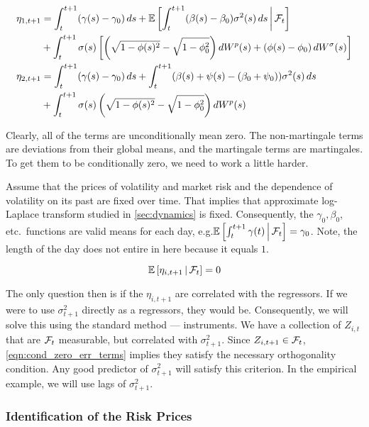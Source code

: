 \documentclass[11pt, letterpaper, twoside, final]{article}
\begin{document}
\begin{alignat}{1}
    \eta_{1,t+1} 
    &= \int_t^{t+1}(\gamma(s) - \gamma_0) \dif s + \E\left[\int_t^{t+1} (\beta(s) - \beta_0) \sigma^2(s) \dif s
        \mvert \F_t\right] \\
    &+ \int_t^{t+1} \sigma(s) \left[\left(\sqrt{1 - \phi(s)^2} - \sqrt{1 - \phi_0^2}\right) \dif W^{p}(s) +
        \left(\phi(s) - \phi_0\right) \dif W^{\sigma}(s)\right] \nonumber \\
%
    \eta_{2,t+1} 
    &= \int_t^{t+1}(\gamma(s) - \gamma_0) \dif s + \int_t^{t+1} (\beta(s) + \psi(s) - (\beta_0 + \psi_0))
       \sigma^2(s) \dif s \\
    &+ \int_t^{t+1} \sigma(s) \left(\sqrt{1 - \phi(s)^2} - \sqrt{1 - \phi_0^2}\right) \dif W^{p}(s) \nonumber 
\end{alignat}

Clearly, all of the terms are  unconditionally mean zero. 
The non-martingale terms are deviations from their global means, and the martingale terms are martingales.
To get them to be conditionally zero, we need to work a little harder.

Assume that the prices of volatility and market risk and the dependence of volatility on its past are fixed over
time.
That implies that approximate log-Laplace transform studied in \cref{sec:dynamics} is fixed.
Consequently, the $\gamma_0, \beta_0$, etc.\ functions are valid means for each day, e.g.\@ $\operatorname{\mathbb{E}}\left[\int_t^{t+1}
\gamma(t) \,\middle\vert\, \mathcal{F}_t \right] = \gamma_0$. 
Note, the length of the day does not entire in here because it equals $1$.

\begin{equation}
    \label{eqn:cond_zero_err_terms}
    \operatorname{\mathbb{E}}\left[\eta_{i,t+1} \,\middle\vert\, \mathcal{F}_{t}\right] = 0
\end{equation}

The only question then is if the $\eta_{i,t+1}$ are correlated with the regressors. 
If we were to use $\sigma^2_{t+1}$ directly as a regressors, they would be.
Consequently, we will solve this using the standard method --- instruments.
We have a collection of $Z_{i,t}$ that are $\mathcal{F}_t$ measurable, but correlated with $\sigma^2_{t+1}$.
Since $Z_{i,t+1} \in \mathcal{F}_t$, \cref{eqn:cond_zero_err_terms} implies they satisfy the necessary orthogonality
condition. 
Any good predictor of $\sigma^2_{t+1}$ will satisfy this criterion.
In the empirical example, we will use lags of $\sigma^2_{t+1}$.


\subsubsection{Identification of the Risk Prices}
\end{document}
